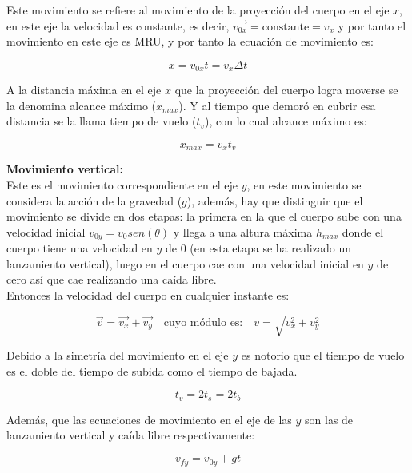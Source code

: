 \documentclass[a5paper,pagesize,10pt,bibtotoc,pointlessnumbers,
normalheadings,DIV=9,fleqn,x11names,table,twoside=false]{scrbook}
\begin{document}
Este movimiento se refiere al movimiento de la proyección del cuerpo en el eje $x$, en este eje la velocidad es constante, es 
decir, $\vec{v_{0x}} =  \text{constante} = v_x$ y por tanto el movimiento en este eje es MRU, y por tanto la ecuación de 
movimiento es:

\begin{equation}
 x = v_{0x}t=v_x \Delta t
\end{equation}

A la distancia máxima en el eje $x$ que la proyección del cuerpo logra moverse se la denomina alcance máximo ($x_{max}$). Y al 
tiempo que demoró en cubrir esa distancia se la llama tiempo de vuelo ($t_v$), con lo cual alcance máximo es:

\begin{equation}
 x_{max} =  v_x t_v
\end{equation}

\textbf{Movimiento vertical:}\\

Este es el movimiento correspondiente en el eje $y$, en este movimiento se considera la acción de la gravedad ($g$), además, hay 
que distinguir que el movimiento se divide en dos etapas: la primera en la que el cuerpo sube con una velocidad inicial $v_{0y} = 
 v_0 sen(\theta)$ y llega a una altura máxima $h_{max}$ donde el cuerpo tiene una velocidad en $y$ de 0 (en esta etapa se ha 
realizado un lanzamiento vertical), luego en el cuerpo cae con una velocidad inicial en $y$ de cero así que cae realizando una 
caída libre.\\

Entonces la velocidad del cuerpo en cualquier instante es:

\begin{equation}
 \vec{v} = \vec{v_x} + \vec{v_y}\quad \text{cuyo módulo es:} \quad v = \sqrt{v_x^2+v_y^2}
\end{equation}

Debido a la simetría del movimiento en el eje $y$ es notorio que el tiempo de vuelo es el doble del tiempo de subida como el 
tiempo de bajada.

\begin{equation}
 t_v = 2t_s =2t_b
\end{equation}

Además, que las ecuaciones de movimiento en el eje de las $y$ son las de lanzamiento vertical y caída libre respectivamente:

\begin{equation}
 v_{fy} = v_{0y} + gt
\end{equation}
\end{document}

